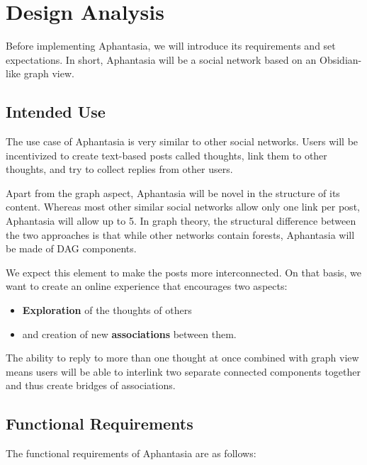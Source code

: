 \chapter{Design Analysis}
\label{chap:design}

Before implementing Aphantasia, we will introduce its requirements and set expectations.
In short, Aphantasia will be a social network based on an Obsidian-like graph view.

\section{Intended Use}
The use case of Aphantasia is very similar to other social networks.
Users will be incentivized to create text-based posts called \glspl{thought}, link them to other thoughts, and try to collect replies from other users.

Apart from the graph aspect, Aphantasia will be novel in the structure of its content.
Whereas most other similar social networks allow only one link per post, Aphantasia will allow up to 5.
In graph theory, the structural difference between the two approaches is that while other networks contain forests,
Aphantasia will be made of \gls{DAG} components.

We expect this element to make the posts more interconnected.
On that basis, we want to create an online experience that encourages two aspects:
\begin{itemize}
  \item \textbf{Exploration} of the thoughts of others
  \item and creation of new \textbf{associations} between them.
\end{itemize}

The ability to reply to more than one thought at once combined with graph view means users will be able to 
interlink two separate connected components together and thus create bridges of associations.

\section{Functional Requirements}
The functional requirements of Aphantasia are as follows:


